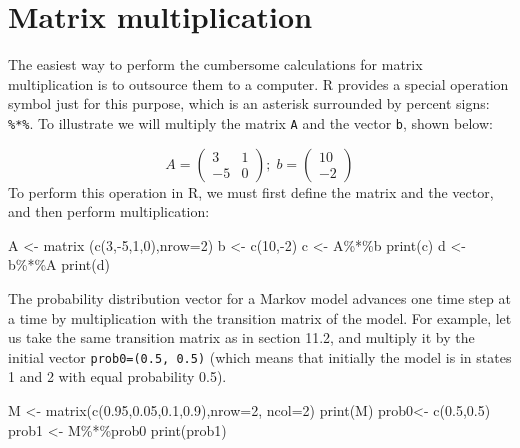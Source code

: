 \documentclass[
  letterpaper,
  DIV=11,
  numbers=noendperiod]{scrreprt}
\newenvironment{Shaded}{\begin{snugshade}}{\end{snugshade}}
\newcommand{\NormalTok}[1]{\textcolor[rgb]{0.00,0.23,0.31}{#1}}
\begin{document}
\hypertarget{matrix-multiplication-1}{%
\section*{Matrix multiplication}\label{matrix-multiplication-1}}


The easiest way to perform the cumbersome calculations for matrix
multiplication is to outsource them to a computer. R provides a special
operation symbol just for this purpose, which is an asterisk surrounded
by percent signs: \texttt{\%*\%}. To illustrate we will multiply the
matrix \texttt{A} and the vector \texttt{b}, shown below:

\[ 
A =  \left(\begin{array}{cc}3& 1 \\ -5 & 0\end{array}\right); \; b = \left(\begin{array}{c} 10 \\ -2 \end{array}\right)
\] To perform this operation in R, we must first define the matrix and
the vector, and then perform multiplication:

\begin{Shaded}
\begin{Highlighting}[]
\NormalTok{A \textless{}{-} matrix (c(3,{-}5,1,0),nrow=2)}
\NormalTok{b \textless{}{-} c(10,{-}2)}
\NormalTok{c \textless{}{-} A\%*\%b}
\NormalTok{print(c)}
\NormalTok{d \textless{}{-} b\%*\%A}
\NormalTok{print(d)}
\end{Highlighting}
\end{Shaded}

The probability distribution vector for a Markov model advances one time
step at a time by multiplication with the transition matrix of the
model. For example, let us take the same transition matrix as in section
11.2, and multiply it by the initial vector \texttt{prob0=(0.5,\ 0.5)}
(which means that initially the model is in states 1 and 2 with equal
probability 0.5).

\begin{Shaded}
\begin{Highlighting}[]
\NormalTok{M \textless{}{-} matrix(c(0.95,0.05,0.1,0.9),nrow=2, ncol=2)}
\NormalTok{print(M)}
\NormalTok{prob0\textless{}{-} c(0.5,0.5)}
\NormalTok{prob1 \textless{}{-} M\%*\%prob0}
\NormalTok{print(prob1)}
\end{Highlighting}
\end{Shaded}
\end{document}
